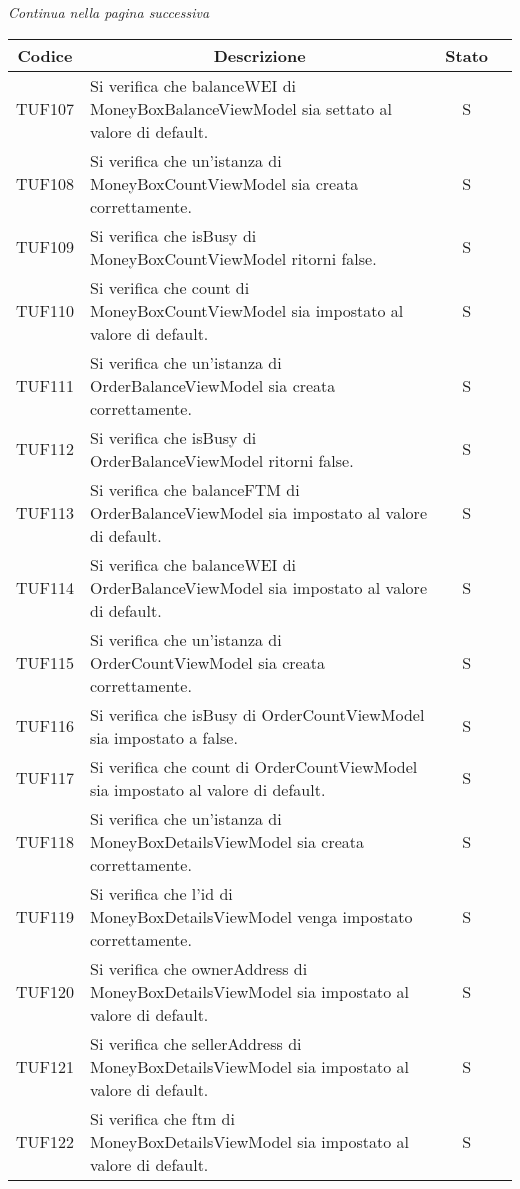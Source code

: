 \begin{center}
  \textit{\small Continua nella pagina successiva}
\end{center}
\begin{table}[H]
  \centering
  \renewcommand{\arraystretch}{1.8}
  \begin{tabular}{c|p{8cm}|c|c}
    \rowcolor[HTML]{125E28}
    \color[HTML]{FFFFFF}\textbf{Codice}
          & \multicolumn{1}{c}{\color[HTML]{FFFFFF}\textbf{Descrizione}}
          & \color[HTML]{FFFFFF}\textbf{Stato}                                                                                                          \\
    \hline
    TUF107 & Si verifica che balanceWEI di MoneyBoxBalanceViewModel sia settato al valore di default. & S \\
    TUF108 & Si verifica che un'istanza di MoneyBoxCountViewModel sia creata correttamente. & S \\
    TUF109 & Si verifica che isBusy di MoneyBoxCountViewModel ritorni false. & S \\
    TUF110 & Si verifica che count di MoneyBoxCountViewModel sia impostato al valore di default. & S \\
    TUF111 & Si verifica che un'istanza di OrderBalanceViewModel sia creata correttamente. & S \\
    TUF112 & Si verifica che isBusy di OrderBalanceViewModel ritorni false. & S \\
    TUF113 & Si verifica che balanceFTM di OrderBalanceViewModel sia impostato al valore di default. & S \\
    TUF114 & Si verifica che balanceWEI di OrderBalanceViewModel sia impostato al valore di default. & S \\
    TUF115 & Si verifica che un'istanza di OrderCountViewModel sia creata correttamente. & S \\
    TUF116 & Si verifica che isBusy di OrderCountViewModel sia impostato a false. & S \\
    TUF117 & Si verifica che count di OrderCountViewModel sia impostato al valore di default. & S \\
    TUF118 & Si verifica che un'istanza di MoneyBoxDetailsViewModel sia creata correttamente. & S \\
    TUF119 & Si verifica che l'id di MoneyBoxDetailsViewModel venga impostato correttamente. & S \\
    TUF120 & Si verifica che ownerAddress di MoneyBoxDetailsViewModel sia impostato al valore di default. & S \\
    TUF121 & Si verifica che sellerAddress di MoneyBoxDetailsViewModel sia impostato al valore di default. & S \\
    TUF122 & Si verifica che ftm di MoneyBoxDetailsViewModel sia impostato al valore di default. & S \\
  \end{tabular}
\end{table}
